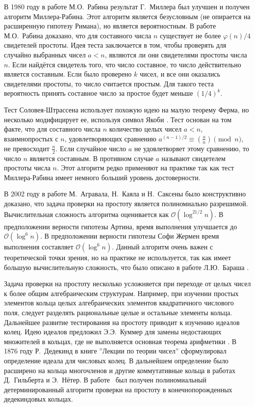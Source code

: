 \documentclass[_00_dissertation.tex]{subfiles}
\begin{document}
В 1980 году в работе М.О.~Рабина \cite{source:Rabin} результат Г.~Миллера был улучшен и получен алгоритм Миллера-Рабина.
Этот алгоритм является безусловным (не опирается на расширенную гипотезу Римана), но является вероятностным.
В работе М.О.~Рабина доказано, что для составного числа $n$ существует не более $\varphi(n)/4$ свидетелей простоты.
Идея теста заключается в том, чтобы проверять для случайно выбранных чисел $a < n$, являются ли они свидетелями простоты числа $n$.
Если найдётся свидетель того, что число составное, то число действительно является составным.
Если было проверено $k$ чисел, и все они оказались свидетелями простоты, то число считается простым.
Для такого теста вероятность принять составное число за простое будет меньше $(1/4)^{k}$.

Тест Соловея-Штрассена использует похожую идею на малую теорему Ферма, но несколько модифицирует ее, используя символ Якоби \cite{source:Solovay}.
Тест основан на том факте, что для составного числа $n$ количество целых чисел $a < n$, взаимнопростых с $n$, удовлетворяющих сравнению $a^{{(n-1)/2}}\equiv \left({\frac{a}{n}}\right){\pmod{n}}$, не превосходит $\frac{n}{2}$.
Если случайное число $a$ не удовлетворяет этому сравнению, то число $n$ является составным.
В противном случае $a$ называют свидетелем простоты числа $n$.
Этот алгоритм редко применяют на практике так как тест Миллера-Рабина имеет немного больший уровень достоверности.

В 2002 году в работе М.~Агравала, Н.~Каяла и Н.~Саксены \cite{source:AKS} было конструктивно доказано, что задача проверки на простоту является полиномиально разрешимой.
Вычислительная сложность алгоритма оценивается как $\mathcal{O}(\log ^{21/2}n)$.
В предположении верности гипотезы Артина, время выполнения улучшается до $\mathcal{O}(\log ^{6}n)$.
В предположении верности гипотезы Софи Жермен время выполнения составляет $\mathcal{O}(\log ^{6}n)$.
Данный алгоритм очень важен с теоретической точки зрения, но на практике не используется, так как имеет большую вычислительную сложность, что было описано в работе Л.Ю.~Бараша \cite{source:Barash}.

Задача проверки на простоту несколько усложняется при переходе от целых чисел к более общим алгебраическим структурам.
Например, при изучении простых элементов кольца целых алгебраических элементов квадратичного числового поля, следует разделять рациональные целые и остальные элементы кольца.
Дальнейшее развитие тестирования на простоту приводит к изучению идеалов колец.
Идею идеалов предложил Э.Э.~Куммер для замены недостающих множителей в кольцах, где не выполняется основная теорема арифметики \cite{source:Stillwell}.
В 1876 году Р.~Дедекинд в книге ''Лекции по теории чисел'' \cite{source:Dedekind} сформулировал определение идеала для числовых колец.
В дальнейшем определение было расширено на кольца многочленов и другие коммутативные кольца в работах Д.~Гильберта и Э.~Нётер.
В работе~\cite{source:Huang_Prime_in_P} был получен полиномиальный детерминированный алгоритм проверки на простоту в конечнопорожденных дедекиндовых кольцах. 
\end{document}
